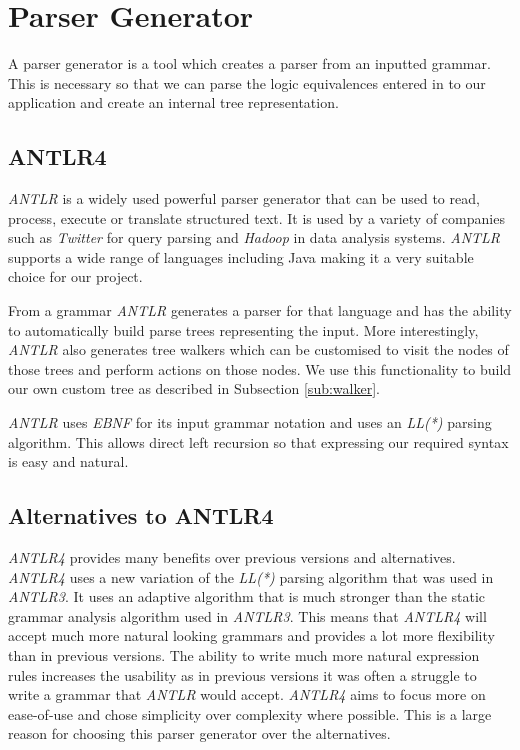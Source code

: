 \documentclass{report}
\begin{document}
\section{Parser Generator}

A parser generator is a tool which creates a parser from an inputted grammar. This is necessary so that we can parse the logic equivalences entered in to our application and create an internal tree representation.

\subsection{ANTLR4}

\emph{ANTLR} is a widely used powerful parser generator that can be used to read, process, execute or translate structured text. It is used by a variety of companies such as \emph{Twitter} for query parsing and \emph{Hadoop} in data analysis systems. \emph{ANTLR} supports a wide range of languages including Java making it a very suitable choice for our project.

From a grammar \emph{ANTLR} generates a parser for that language and has the ability to automatically build parse trees representing the input. More interestingly, \emph{ANTLR} also generates tree walkers which can be customised to visit the nodes of those trees and perform actions on those nodes. We use this functionality to build our own custom tree as described in Subsection \ref{sub:walker}.

\emph{ANTLR} uses \emph{EBNF} for its input grammar notation and uses an \emph{LL(*)} parsing algorithm. This allows direct left recursion so that expressing our required syntax is easy and natural. 

\subsection{Alternatives to ANTLR4}
\label{sub:alternatives_to_antlr4}

\emph{ANTLR4} provides many benefits over previous versions and alternatives. \emph{ANTLR4} uses a new variation of the \emph{LL(*)} parsing algorithm that was used in \emph{ANTLR3}. It uses an adaptive algorithm that is much stronger than the static grammar analysis algorithm used in \emph{ANTLR3}. This means that \emph{ANTLR4} will accept much more natural looking grammars and provides a lot more flexibility than in previous versions. The ability to write much more natural expression rules increases the usability as in previous versions it was often a struggle to write a grammar that \emph{ANTLR} would accept. \emph{ANTLR4} aims to focus more on ease-of-use and chose simplicity over complexity where possible. This is a large reason for choosing this parser generator over the alternatives.
\end{document}
